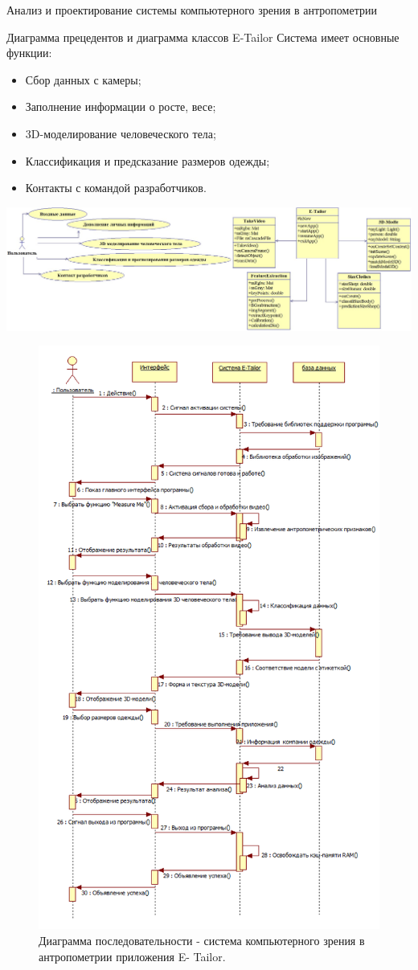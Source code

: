 \documentclass[10pt,pdf,hyperref={unicode},xcolor=table]{beamer}
\begin{document}
\begin{frame}{Анализ и проектирование системы компьютерного зрения в антропометрии}
\begin{block}{Диаграмма прецедентов и диаграмма классов E-Tailor}
Система имеет основные функции:
\begin{itemize}
	\item Сбор данных с камеры;
	\item Заполнение информации о росте, весе;
	\item 3D-моделирование человеческого тела;
	\item Классификация и предсказание размеров одежды;
	\item Контакты с командой разработчиков.
\end{itemize}
\end{block}
\includegraphics[width=1\linewidth]{p15}
\end{frame}
\begin{frame}{}
\begin{figure}[ht!]
\centering
\includegraphics[width=0.45\linewidth]{p16}
\begin{center}
\caption{Диаграмма последовательности - система компьютерного зрения в антропометрии приложения E- Tailor.}
\end{center}
\end{figure}
\end{frame}
\end{document}
